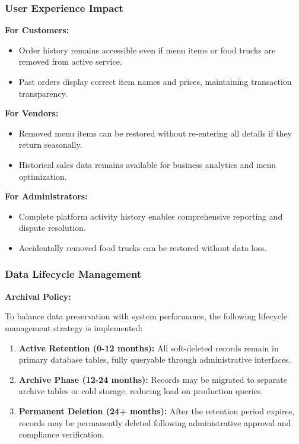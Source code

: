 \documentclass[12pt,a4paper]{article}
\begin{document}
\subsubsection{User Experience Impact}

\textbf{For Customers:}
\begin{itemize}[leftmargin=2em, itemsep=6pt]
    \item Order history remains accessible even if menu items or food trucks are removed from active service.
    \item Past orders display correct item names and prices, maintaining transaction transparency.
\end{itemize}

\vspace{0.5em}

\textbf{For Vendors:}
\begin{itemize}[leftmargin=2em, itemsep=6pt]
    \item Removed menu items can be restored without re-entering all details if they return seasonally.
    \item Historical sales data remains available for business analytics and menu optimization.
\end{itemize}

\vspace{0.5em}

\textbf{For Administrators:}
\begin{itemize}[leftmargin=2em, itemsep=6pt]
    \item Complete platform activity history enables comprehensive reporting and dispute resolution.
    \item Accidentally removed food trucks can be restored without data loss.
\end{itemize}

\subsubsection{Data Lifecycle Management}

\textbf{Archival Policy:}

To balance data preservation with system performance, the following lifecycle management strategy is implemented:

\begin{enumerate}[leftmargin=2em, itemsep=6pt]
    \item \textbf{Active Retention (0-12 months):} All soft-deleted records remain in primary database tables, fully queryable through administrative interfaces.
    \item \textbf{Archive Phase (12-24 months):} Records may be migrated to separate archive tables or cold storage, reducing load on production queries.
    \item \textbf{Permanent Deletion (24+ months):} After the retention period expires, records may be permanently deleted following administrative approval and compliance verification.
\end{enumerate}
\end{document}
